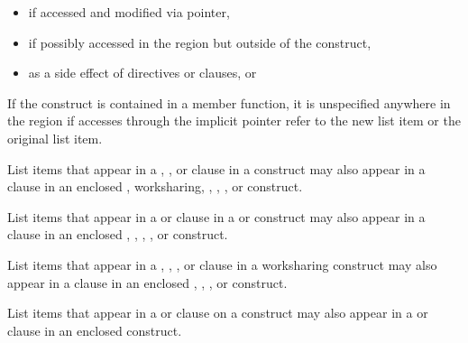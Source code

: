 \begin{itemize}
\item if accessed and modified via pointer,

\item if possibly accessed in the region but outside of the construct,

\item as a side effect of directives or clauses, or

\end{itemize}
%
\begin{cppspecific}
If the construct is contained in a member function, it is unspecified
anywhere in the region if accesses through the implicit 
pointer refer to the new list item or the original list item.
\end{cppspecific}
%
List items that appear in a , , or
 clause in a  construct may also appear
in a  clause in an enclosed ,
worksharing, , , , or
 construct.

List items that appear in a  or 
clause in a  or  construct may also appear in a 
clause in an enclosed , , , , or
 construct.

List items that appear in a , ,
, or  clause in a worksharing
construct may also appear in a  clause in an enclosed
, , , or  construct.

List items that appear in a  or  clause on a
 construct may also appear in a  or
 clause in an enclosed  construct.

